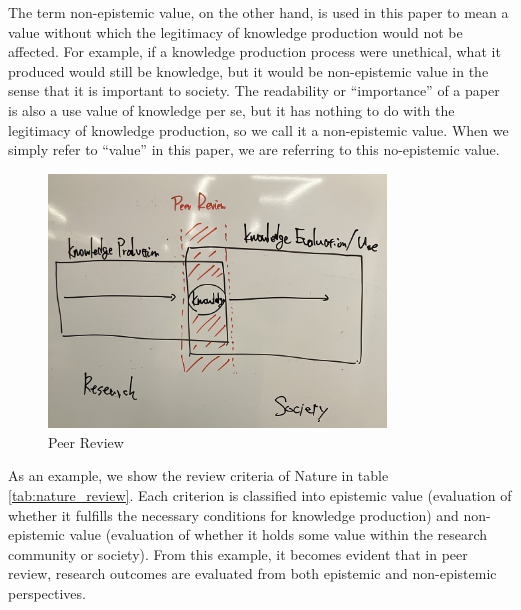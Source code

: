 \documentclass{book}
\begin{document}
The term non-epistemic value, on the other hand, is used in this paper to mean a value without which the legitimacy of knowledge production would not be affected. For example, if a knowledge production process were unethical, what it produced would still be knowledge, but it would be non-epistemic value in the sense that it is important to society. The readability or ``importance'' of a paper is also a use value of knowledge per se, but it has nothing to do with the legitimacy of knowledge production, so we call it a non-epistemic value. When we simply refer to ``value'' in this paper, we are referring to this no-epistemic value.

\begin{figure}[htb]
    \centering
    \includegraphics[width=0.8\textwidth]{figs/peer_review.jpg}
    \caption{Peer Review}
    \label{fig:peer_review}
\end{figure}

As an example, we show the review criteria of Nature in table \ref{tab:nature_review}. Each criterion is classified into epistemic value (evaluation of whether it fulfills the necessary conditions for knowledge production) and non-epistemic value (evaluation of whether it holds some value within the research community or society). From this example, it becomes evident that in peer review, research outcomes are evaluated from both epistemic and non-epistemic perspectives. 
\end{document}
